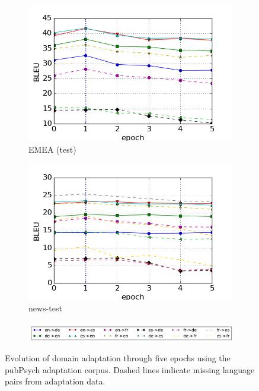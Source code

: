 \documentclass[a4paper,11pt]{article}
\begin{document}
\begin{figure}
\begin{subfigure}[b]{0.45\textwidth}
        \includegraphics[width=\textwidth]{./img/adam/emea_test}
        \caption{EMEA (test)}
        \label{fig:emea_test}
    \end{subfigure}
    \begin{subfigure}[b]{0.45\textwidth}
        \includegraphics[width=\textwidth]{./img/adam/newstest}
        \caption{news-test}
        \label{fig:news-test}
    \end{subfigure}
    \begin{subfigure}[b]{.9\textwidth}
		\includegraphics[width=\textwidth]{./img/adam/leg}    
    \end{subfigure}
    \caption{Evolution of domain adaptation through five epochs using the pubPsych adaptation corpus. Dashed lines indicate missing language pairs from adaptation data.}\label{fig:adapt_epochs}
\end{figure}
\end{document}
